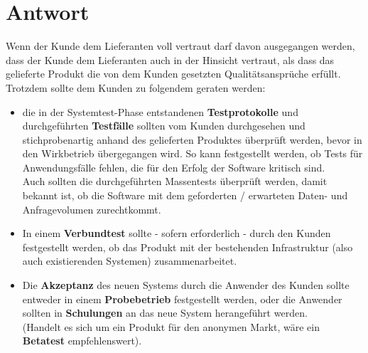 
\section*{Antwort}
Wenn der Kunde dem Lieferanten voll vertraut darf davon ausgegangen werden, dass der Kunde dem Lieferanten auch in der Hinsicht vertraut, als dass das gelieferte Produkt die von dem Kunden gesetzten Qualitätsansprüche erfüllt.\\
Trotzdem sollte dem Kunden zu folgendem geraten werden:
\begin{itemize}
    \item die in der Systemtest-Phase entstandenen \textbf{Testprotokolle} und durchgeführten \textbf{Testfälle} sollten vom Kunden durchgesehen und stichprobenartig anhand des gelieferten Produktes überprüft werden, bevor in den Wirkbetrieb übergegangen wird.
    So kann festgestellt werden, ob Tests für Anwendungsfälle fehlen, die für den Erfolg der Software kritisch sind.\\
    Auch sollten die durchgeführten Massentests überprüft werden, damit bekannt ist, ob die Software mit dem geforderten / erwarteten Daten- und Anfragevolumen zurechtkommt.
    \item In einem \textbf{Verbundtest} sollte - sofern erforderlich - durch den Kunden  festgestellt werden, ob das Produkt mit der bestehenden Infrastruktur (also auch existierenden Systemen) zusammenarbeitet.
    \item Die \textbf{Akzeptanz} des neuen Systems durch die Anwender des Kunden sollte entweder in einem \textbf{Probebetrieb} festgestellt werden, oder die Anwender sollten in \textbf{Schulungen} an das neue System herangeführt werden.\\
    (Handelt es sich um ein Produkt für den anonymen Markt, wäre ein \textbf{Betatest} empfehlenswert).
\end{itemize}